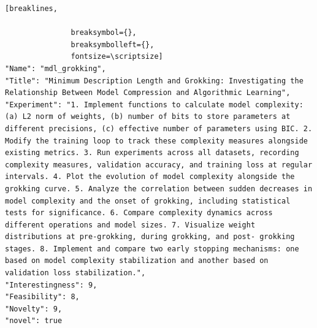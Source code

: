 \begin{tcolorbox}[
  breakable,
  colback  = blue!5!white,
  colframe = blue!75!black,
  title    = {Idea 22/50 - \texttt{mdl\_grokking}},
  fontupper=\scriptsize\ttfamily,
]
\begin{Verbatim}[breaklines,

               breaksymbol={},
               breaksymbolleft={},
               fontsize=\scriptsize]
"Name": "mdl_grokking",
"Title": "Minimum Description Length and Grokking: Investigating the Relationship Between Model Compression and Algorithmic Learning",
"Experiment": "1. Implement functions to calculate model complexity: (a) L2 norm of weights, (b) number of bits to store parameters at different precisions, (c) effective number of parameters using BIC. 2. Modify the training loop to track these complexity measures alongside existing metrics. 3. Run experiments across all datasets, recording complexity measures, validation accuracy, and training loss at regular intervals. 4. Plot the evolution of model complexity alongside the grokking curve. 5. Analyze the correlation between sudden decreases in model complexity and the onset of grokking, including statistical tests for significance. 6. Compare complexity dynamics across different operations and model sizes. 7. Visualize weight distributions at pre-grokking, during grokking, and post- grokking stages. 8. Implement and compare two early stopping mechanisms: one based on model complexity stabilization and another based on validation loss stabilization.",
"Interestingness": 9,
"Feasibility": 8,
"Novelty": 9,
"novel": true
\end{Verbatim}
\end{tcolorbox}

